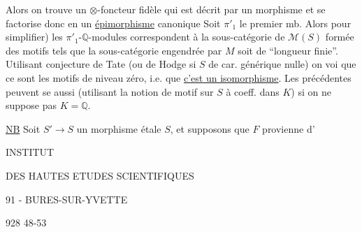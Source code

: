 Alors on trouve un $\otimes$-foncteur  fidèle
qui est décrit par un morphisme
et se factorise donc en un \uline{épimorphisme} canonique
\margin{$*$}
Soit $\pi'_1$ le premier mb. Alors 
 
pour simplifier) les $\pi'_1$-$\mathbb{Q}$-modules
correspondent à la sous-catégorie de $\mathcal{M}(S)$ formée
des motifs  tels que la sous-\inserted{$\otimes$-}catégorie engendrée
par $M$ soit de ``longueur finie''. Utilisant
conjecture de Tate (ou de Hodge si $S$ de
car. générique nulle) on  voi que ce sont les
motifs de  niveau  zéro, 
i.e. que \uline{c'est un
isomorphisme}. Les  précédentes peuvent
se  aussi (utilisant la notion de
motif sur $S$ à coeff. dans $K$) si on ne suppose
pas $K=\mathbb{Q}$.


\uline{NB} Soit $S'\longrightarrow S$ un morphisme
étale  $S$,  et supposons que $F$ provienne d'

INSTITUT

DES HAUTES ETUDES SCIENTIFIQUES

91 - BURES-SUR-YVETTE

928 48-53
